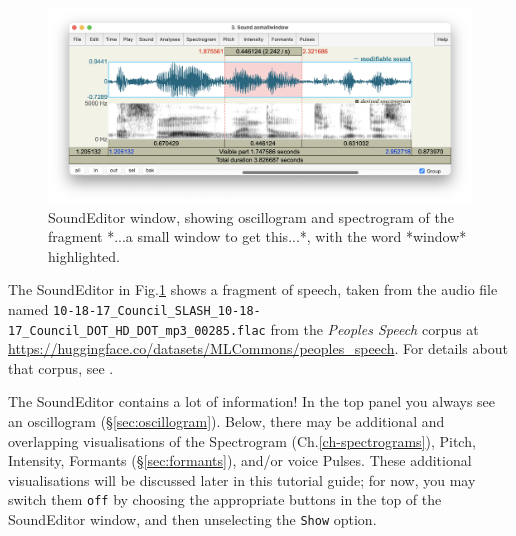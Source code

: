 \documentclass[
]{book}
\begin{document}
\begin{figure}

{\centering \includegraphics{figures/asmallwindowtogetthis_SoundEditor2050124} 

}

\caption{SoundEditor window, showing oscillogram and spectrogram of the fragment *...a small window to get this...*, with the word *window* highlighted.}\label{fig:window-soundeditor}
\end{figure}

\label{box-windowsfile-details}
The SoundEditor in Fig.\ref{fig:window-soundeditor} shows a fragment of speech, taken from the audio file named \texttt{10-18-17\_Council\_SLASH\_10-18-17\_Council\_DOT\_HD\_DOT\_mp3\_00285.flac} from the \emph{Peoples Speech} corpus at \url{https://huggingface.co/datasets/MLCommons/peoples_speech}. For details about that corpus, see \citet{Galvez_Diamos_Ciro_Cerón_Achorn_Gopi_Kanter_Lam_Mazumder_Reddi_2021}.

The SoundEditor contains a lot of information! In the top panel you always see an oscillogram (§\ref{sec:oscillogram}). Below, there may be additional and overlapping visualisations of the Spectrogram (Ch.\ref{ch-spectrograms}), Pitch, Intensity, Formants (§\ref{sec:formants}), and/or voice Pulses. These additional visualisations will be discussed later in this tutorial guide; for now, you may switch them \texttt{off} by choosing the appropriate buttons in the top of the SoundEditor window, and then unselecting the \texttt{Show} option.
\end{document}
